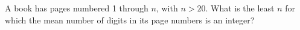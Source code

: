 A book has pages numbered 1 through $n$, with $n>20$. What is the least $n$ for which the mean number of digits in its page numbers is an integer?
